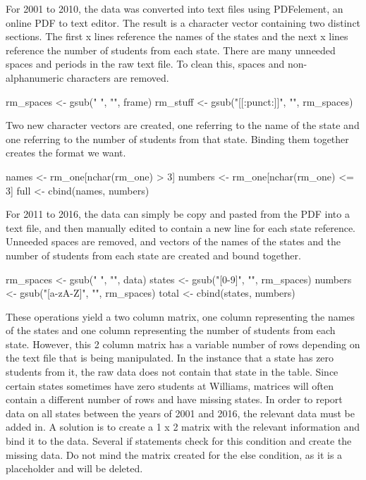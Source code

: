 For 2001 to 2010, the data was converted into text files using
PDFelement, an online PDF to text editor. The result is a character
vector containing two distinct sections. The first x lines reference the
names of the states and the next x lines reference the number of
students from each state. There are many unneeded spaces and periods in
the raw text file. To clean this, spaces and non-alphanumeric characters
are removed.

\begin{Schunk}
\begin{Sinput}
rm_spaces <- gsub(" ", "", frame) 
rm_stuff <- gsub("[[:punct:]]", "", rm_spaces)
\end{Sinput}
\end{Schunk}

Two new character vectors are created, one referring to the name of the
state and one referring to the number of students from that state.
Binding them together creates the format we want.

\begin{Schunk}
\begin{Sinput}
names <- rm_one[nchar(rm_one) > 3] 
numbers <- rm_one[nchar(rm_one) <= 3]
full <- cbind(names, numbers)
\end{Sinput}
\end{Schunk}

For 2011 to 2016, the data can simply be copy and pasted from the PDF
into a text file, and then manually edited to contain a new line for
each state reference. Unneeded spaces are removed, and vectors of the
names of the states and the number of students from each state are
created and bound together.

\begin{Schunk}
\begin{Sinput}
rm_spaces <- gsub(" ", "", data) 
states <- gsub("[0-9]", "", rm_spaces) 
numbers <- gsub("[a-zA-Z]", "", rm_spaces) 
total <- cbind(states, numbers)
\end{Sinput}
\end{Schunk}

These operations yield a two column matrix, one column representing the
names of the states and one column representing the number of students
from each state. However, this 2 column matrix has a variable number of
rows depending on the text file that is being manipulated. In the
instance that a state has zero students from it, the raw data does not
contain that state in the table. Since certain states sometimes have
zero students at Williams, matrices will often contain a different
number of rows and have missing states. In order to report data on all
states between the years of 2001 and 2016, the relevant data must be
added in. A solution is to create a 1 x 2 matrix with the relevant
information and bind it to the data. Several if statements check for
this condition and create the missing data. Do not mind the matrix
created for the else condition, as it is a placeholder and will be
deleted.


